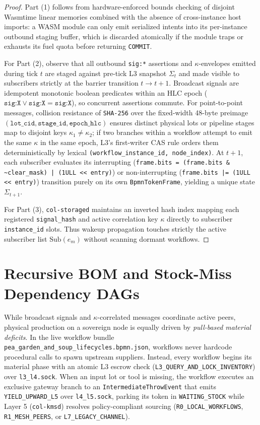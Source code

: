 \begin{proof}
Part (1) follows from hardware-enforced bounds checking of disjoint Wasmtime linear memories combined with
the absence of cross-instance host imports: a WASM module can only emit serialized intents into its
per-instance outbound staging buffer, which is discarded atomically if the module traps or exhausts its
fuel quota before returning \texttt{COMMIT}.

For Part (2), observe that all outbound \texttt{sig:*} assertions and $\kappa$-envelopes emitted during
tick $t$ are staged against pre-tick L3 snapshot $\Sigma_t$ and made visible to subscribers strictly at
the barrier transition $t \to t+1$. Broadcast signals are idempotent monotonic boolean predicates within
an HLC epoch ($\texttt{sig:X} \lor \texttt{sig:X} = \texttt{sig:X}$), so concurrent assertions commute.
For point-to-point messages, collision resistance of \texttt{SHA-256} over the fixed-width 48-byte
preimage $(\texttt{lot\_cid}, \texttt{stage\_id}, \texttt{epoch\_hlc})$ ensures distinct physical lots or
pipeline stages map to disjoint keys $\kappa_1 \neq \kappa_2$; if two branches within a workflow attempt
to emit the same $\kappa$ in the same epoch, L3's first-writer CAS rule orders them deterministically by
lexical \texttt{(workflow\_instance\_id, node\_index)}. At $t+1$, each subscriber evaluates its
interrupting (\texttt{frame.bits = (frame.bits \& \textasciitilde clear\_mask) | (1ULL << entry)}) or
non-interrupting (\texttt{frame.bits |= (1ULL << entry)}) transition purely on its own
\texttt{BpmnTokenFrame}, yielding a unique state $\Sigma_{t+1}$.

For Part (3), \texttt{col-storaged} maintains an inverted hash index mapping each registered
\texttt{signal\_hash} and active correlation key $\kappa$ directly to subscriber \texttt{instance\_id}
slots. Thus wakeup propagation touches strictly the active subscriber list $\mathrm{Sub}(e_m)$ without
scanning dormant workflows.
\end{proof}

\section{Recursive BOM and Stock-Miss Dependency DAGs}
\label{sec:recursive-bom-dags}

While broadcast signals and $\kappa$-correlated messages coordinate active peers, physical production on a
sovereign node is equally driven by \emph{pull-based material deficits}. In the live workflow bundle
\texttt{pea\_garden\_and\_soup\_lifecycles.bpmn.json}, workflows never hardcode procedural calls to spawn
upstream suppliers. Instead, every workflow begins its material phase with an atomic L3 escrow check
(\texttt{L3\_QUERY\_AND\_LOCK\_INVENTORY}) over \texttt{l3\_l4.sock}. When an input lot or tool is
missing, the workflow executes an exclusive gateway branch to an \texttt{IntermediateThrowEvent} that
emits \texttt{YIELD\_UPWARD\_L5} over \texttt{l4\_l5.sock}, parking its token in \texttt{WAITING\_STOCK}
while Layer 5 (\texttt{col-kmsd}) resolves policy-compliant sourcing (\texttt{R0\_LOCAL\_WORKFLOWS},
\texttt{R1\_MESH\_PEERS}, or \texttt{L7\_LEGACY\_CHANNEL}).

